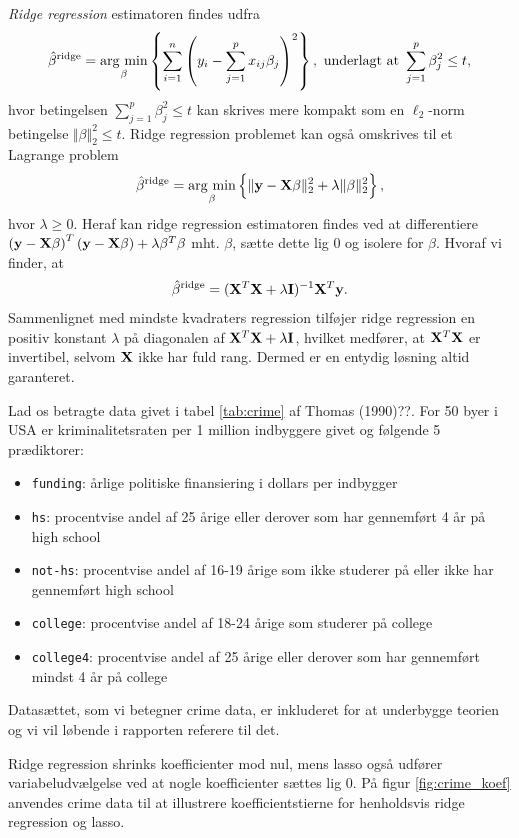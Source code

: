 \textit{Ridge regression} estimatoren findes udfra 
\begin{align} 
\hat{\beta}^\text{ridge} = \argmin_{\beta} \cbr{\sum_{i=1}^n \del{y_i - \sum_{j=1}^p x_{ij} \beta_j}^2}, \ \text{underlagt at } \sum_{j=1}^p \beta_j^2 \leq t, \label{eq:2.7} 
\end{align} 
hvor betingelsen $\sum_{j=1}^p \beta_j^2 \leq t$ kan skrives mere kompakt som en \(\ell_2\)-norm betingelse $\Vert \beta \Vert_2^2 \leq t$.
Ridge regression problemet kan også omskrives til et Lagrange problem
\begin{align*}
\hat{\beta}^\text{ridge} = \argmin_{\beta} \cbr{ \Vert \y - \X \beta \Vert_2^2 + \lambda \Vert \beta \Vert_2^2},
\end{align*}
hvor $\lambda \geq 0$.
Heraf kan ridge regression estimatoren findes ved at differentiere \(\del{\y - \X \beta}^T \del{\y - \X \beta} + \lambda \beta^T \beta\) mht. $\beta$, sætte dette lig 0 og isolere for $\beta$. Hvoraf vi finder, at
\begin{align} 
\hat{\beta}^\text{ridge} = (\mathbf{X}^T \mathbf{X} + \lambda \mathbf{I})^{-1} \mathbf{X}^T \mathbf{y}. \label{eq:ridge_estimator}
\end{align}  
Sammenlignet med mindste kvadraters regression tilføjer ridge regression en positiv konstant $\lambda$ på diagonalen af $\mathbf{X}^T \mathbf{X} + \lambda \mathbf{I}$, hvilket medfører, at \(\mathbf{X}^T \mathbf{X}\) er invertibel, selvom $\mathbf{X}$ ikke har fuld rang. 
Dermed er en entydig løsning altid garanteret. 

\begin{exmp}
Lad os betragte data givet i tabel \ref{tab:crime} af Thomas (1990)??.
For 50 byer i USA er kriminalitetsraten per 1 million indbyggere givet og følgende 5 prædiktorer: 
\begin{itemize}
\item \texttt{funding}: årlige politiske finansiering i dollars per indbygger
\item \texttt{hs}: procentvise andel af 25 årige eller derover som har gennemført 4 år på high school
\item \texttt{not-hs}: procentvise andel af 16-19 årige som ikke studerer på eller ikke har gennemført high school
\item \texttt{college}: procentvise andel af 18-24 årige som studerer på college
\item \texttt{college4}: procentvise andel af 25 årige eller derover som har gennemført mindst 4 år på college
\end{itemize}
%

%
Datasættet, som vi betegner crime data, er inkluderet for at underbygge teorien og vi vil løbende i rapporten referere til det.
\end{exmp}
Ridge regression shrinks koefficienter mod nul, mens lasso også udfører variabeludvælgelse ved at nogle koefficienter sættes lig 0.
På figur \ref{fig:crime_koef} anvendes crime data til at illustrere koefficientstierne for henholdsvis ridge regression og lasso.
%
%


